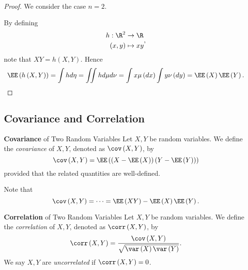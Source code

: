 \documentclass[stat901]{subfiles}
\begin{document}
    \clearpage

    \begin{proof}
        We consider the case $n=2$.

        By defining 
        \begin{equation*}
            \begin{aligned}
                h:\R^{2}&\to\R \\ 
                \left( x,y \right)&\mapsto xy
            \end{aligned} ,
        \end{equation*}
        note that $XY = h\left( X,Y \right)$. Hence
        \begin{equation*}
            \EE\left( h\left( X,Y \right) \right) = \int hd\eta = \iint hd\mu d\nu = \int x\mu\left( dx \right) \int y\nu\left( dy \right) = \EE\left( X \right)\EE\left( Y \right).
        \end{equation*}
    \end{proof}
    
    \subsection{Covariance and Correlation}

    \begin{definition}{\textbf{Covariance} of Two Random Variables}
        Let $X,Y$ be random variables. We define the \emph{covariance} of $X,Y$, denoted as $\cov\left( X,Y \right)$, by
        \begin{equation*}
            \cov\left( X,Y \right) = \EE\left( \left( X-\EE\left( X \right) \right)\left( Y-\EE\left( Y \right) \right) \right)
        \end{equation*}
        provided that the related quantities are well-defined.
    \end{definition}

    \np Note that
    \begin{equation*}
        \cov\left( X,Y \right) = \cdots = \EE\left( XY \right)-\EE\left( X \right)\EE\left( Y \right).
    \end{equation*}
    
    \begin{definition}{\textbf{Correlation} of Two Random Variables}
        Let $X,Y$ be random variables. We define the \emph{correlation} of $X,Y$, denoted as $\corr\left( X,Y \right)$, by
        \begin{equation*}
            \corr\left( X,Y \right) = \frac{\cov\left( X,Y \right)}{\sqrt{\var\left( X \right)\var\left( Y \right)}}.
        \end{equation*}
        We say $X,Y$ are \emph{uncorrelated} if $\corr\left( X,Y \right)=0$.
    \end{definition}
\end{document}
